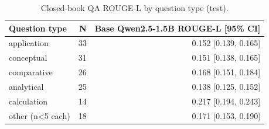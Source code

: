 \begin{table}[t]
\centering
\caption{Closed-book QA ROUGE-L by question type (test).}
\label{tab:t6_qa_by_type}
\begin{tabular}{lrr}
\toprule
Question type & N & Base Qwen2.5-1.5B ROUGE-L [95\% CI] \\
\midrule
application & 33 & 0.152 [0.139, 0.165] \\
conceptual & 31 & 0.151 [0.138, 0.165] \\
comparative & 26 & 0.168 [0.151, 0.184] \\
analytical & 25 & 0.138 [0.125, 0.152] \\
calculation & 14 & 0.217 [0.194, 0.243] \\
other (n<5 each) & 18 & 0.171 [0.153, 0.190] \\
\bottomrule
\end{tabular}
\end{table}
